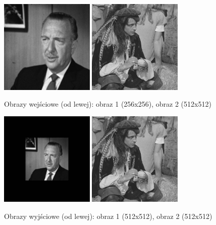 \documentclass[final,a4paper,openany,12pt]{mwbk}
\begin{document}
\begin{figure}[H]
	\begin{center}
		\includegraphics[width=0.4\textwidth]{gentelman_gray}
		\includegraphics[width=0.4\textwidth]{pirate_gray}
	\end{center}
	\caption{Obrazy wejściowe (od lewej): obraz 1 (256x256), obraz 2 (512x512)}
\end{figure}

\begin{figure}[H]
	\begin{center}
		\includegraphics[width=0.4\textwidth]{gentelman_gray_unificationGeo_result}
		\includegraphics[width=0.4\textwidth]{pirate_gray_unificationGeo_result}
	\end{center}
	\caption{Obrazy wyjściowe (od lewej): obraz 1 (512x512), obraz 2 (512x512)}
\end{figure}
\end{document}

